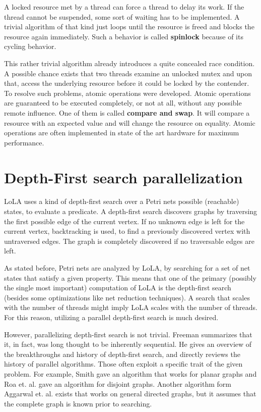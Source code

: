 A locked resource met by a thread can force a thread to delay its work. If the thread cannot be suspended, some sort of waiting has to be implemented. A trivial algorithm of that kind just loops until the resource is freed and blocks the resource again immediately. Such a behavior is called \textbf{spinlock} because of its cycling behavior.

This rather trivial algorithm already introduces a quite concealed race condition. A possible chance exists that two threads examine an unlocked mutex and upon that, access the underlying resource before it could be locked by the contender. To resolve such problems, atomic operations were developed. Atomic operations are guaranteed to be executed completely, or not at all, without any possible remote influence. One of them is called \textbf{compare and swap}. It will compare a resource with an expected value and will change the resource on equality. Atomic operations are often implemented in state of the art hardware for maximum performance.

\section{Depth-First search parallelization}
LoLA uses a kind of depth-first search over a Petri nets possible (reachable) states, to evaluate a predicate. A depth-first search discovers graphs\cite[chapter~1]{bondy1976graph} by traversing the first possible edge of the current vertex. If no unknown edge is left for the current vertex, backtracking\cite{golomb1965backtrack} is used, to find a previously discovered vertex with untraversed edges. The graph is completely discovered if no traversable edges are left.

As stated before, Petri nets are analyzed by LoLA, by searching for a set of net states that satisfy a given property. This means that one of the primary (possibly the single most important) computation of LoLA is the depth-first search (besides some optimizations like net reduction techniques). A search that scales with the number of threads might imply LoLA scales with the number of threads. For this reason, utilizing a parallel depth-first search is much desired.

However, parallelizing depth-first search is not trivial. Freeman summarizes that it, in fact, was long thought to be inherently sequential\cite{freeman1991parallel}. He gives an overview of the breakthroughs and history of depth-first search, and  directly reviews the history of parallel algorithms. Those often exploit a specific trait of the given problem. For example, Smith gave an algorithm that works for planar graphs\cite{smith1986parallel} and Roa et. al. gave an algorithm for disjoint graphs\cite{rao1987parallel}. Another algorithm form Aggarwal et. al. exists that works on general directed graphs\cite{Aggarwal:1989:PDS:73007.73035}, but it assumes that the complete graph is known prior to searching.

